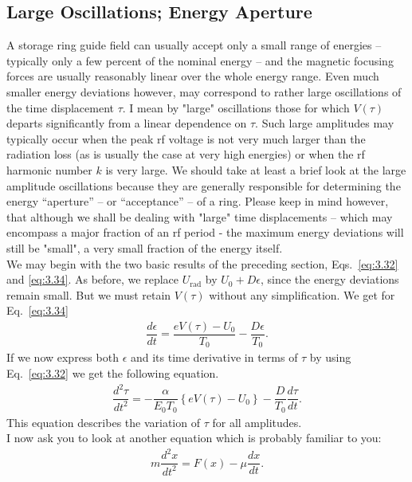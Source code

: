 \subsection{Large Oscillations; Energy Aperture}\label{sec:3.6}

A storage ring guide field can usually accept only a small range of energies -- typically
 only a few percent of the nominal energy -- and the magnetic focusing forces are usually reasonably linear over the whole energy range. Even much smaller energy deviations however, may correspond to rather large oscillations of the time displacement $\tau$. I mean by "large" oscillations those for which $V(\tau)$ departs significantly from a linear dependence on $\tau$.
 Such large amplitudes may typically occur when the peak rf voltage is not very much larger than the radiation loss (as is usually the case at very high energies) or when the rf harmonic number
$k$ is very large. We should take at least a brief look at the large amplitude oscillations  because they are generally responsible for determining the energy “aperture” -- or “acceptance”
 -- of a ring. Please keep in mind however, that although we shall be dealing with "large" time displacements -- which may encompass a major fraction of an rf period - the maximum energy deviations will still be "small", a very small fraction of the energy itself.\\
We may begin with the two basic results of the preceding section, Eqs.~\eqref{eq:3.32} and \eqref{eq:3.34}. As before, we replace $U_{\text{rad}}$ by $U_0 + D\epsilon$, since the energy deviations remain small. But we must retain $V(\tau)$ without any simplification. We get for
Eq.~\eqref{eq:3.34}
\begin{align}
	\dfrac{d\epsilon}{dt} = \dfrac{eV(\tau)-U_0}{T_0}-\dfrac{D\epsilon}{T_0}.
\end{align}
If we now express both $\epsilon$ and its time derivative in terms of $\tau$ by using Eq.~\eqref{eq:3.32} we get the following equation.
\begin{align}\label{eq:3.49}
	\dfrac{d^2\tau}{dt^2} = -\dfrac{\alpha}{E_0 T_0} \left\lbrace eV(\tau) - U_0 \right\rbrace - \dfrac{D}{T_0} \dfrac{d\tau}{dt}.
\end{align}
This equation describes the variation of $\tau$ for all amplitudes.\\
I now ask you to look at another equation which is probably familiar to you:
\begin{align}\label{eq:3.50}
	m\dfrac{d^2x}{dt^2} = F(x) - \mu \dfrac{dx}{dt}.
\end{align}
